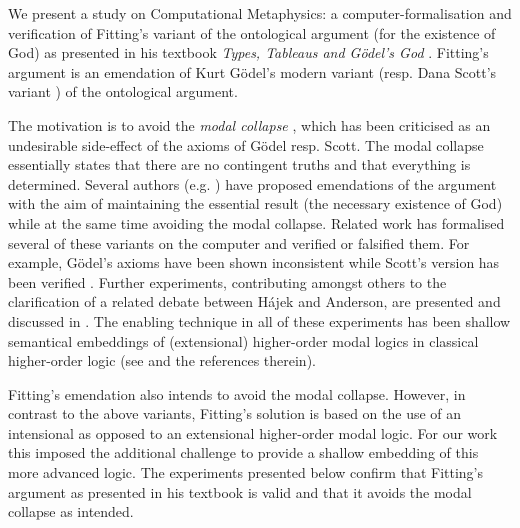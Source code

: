 %
\begin{isabellebody}%
%
%
%
%
%
%
%
%
\isamarkuptrue%
%
\begin{isamarkuptext}%
We present a study on Computational Metaphysics: a computer-formalisation and verification
of Fitting's variant of the ontological argument (for the existence of God) as presented in
his textbook \emph{Types, Tableaus and G\"odel's God} \cite{Fitting}. Fitting's argument 
is an emendation of Kurt G\"odel's modern variant \cite{GoedelNotes} (resp. Dana Scott's 
variant \cite{ScottNotes}) of the ontological argument.%
\end{isamarkuptext}\isamarkuptrue%
%
\begin{isamarkuptext}%
The motivation is to avoid the \emph{modal collapse} \cite{Sobel,sobel2004logic}, which has been criticised
as an undesirable side-effect of the axioms of G\"odel resp. Scott. The modal collapse essentially  
states that  there are no contingent truths and that everything is determined.
Several authors (e.g. \cite{anderson90:_some_emend_of_goedel_ontol_proof,AndersonGettings,Hajek2002,bjordal99}) 
have proposed emendations of the argument with the aim of maintaining the essential result 
(the necessary existence of God) while at the same time avoiding the modal collapse. 
Related work  has formalised several of these variants on the computer and verified or falsified them. For example,
G\"odel's axioms \cite{GoedelNotes} have been shown inconsistent \cite{C55,C60}
while Scott's version has been verified \cite{ECAI}. Further experiments, contributing amongst others
to the clarification of a related debate between H\'ajek and Anderson, are presented and discussed in
\cite{J23}. The enabling technique in all of these experiments has been
shallow semantical embeddings of (extensional) higher-order modal logics in classical higher-order
logic (see \cite{J23,R59} and the references therein).%
\end{isamarkuptext}\isamarkuptrue%
%
\begin{isamarkuptext}%
Fitting's emendation also intends to avoid the modal collapse. However, in contrast to the above variants, Fitting's
solution is based on the use of an intensional as opposed to an extensional higher-order modal logic.
For our work this imposed the additional challenge to provide a shallow embedding of this more advanced
logic. The experiments presented below confirm that Fitting's argument as presented in his textbook \cite{Fitting}
is valid and that it avoids the modal collapse as intended.%

\end{isamarkuptext}
\end{isabellebody}
